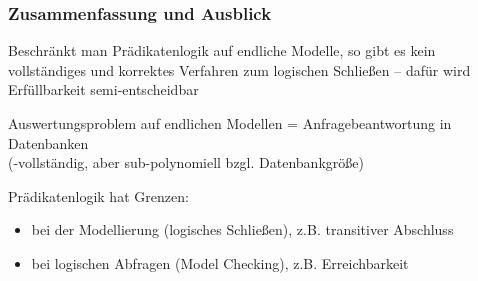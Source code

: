 \documentclass[aspectratio=1610,onlymath]{beamer}
\begin{document}
\begin{frame}\frametitle{Zusammenfassung und Ausblick}

Beschränkt man Prädikatenlogik auf endliche Modelle, so gibt es kein vollständiges und korrektes Verfahren zum logischen Schließen -- dafür wird Erfüllbarkeit semi-entscheidbar\bigskip

Auswertungsproblem auf endlichen Modellen = Anfragebeantwortung in Datenbanken\\
(\PSpace-vollständig, aber sub-polynomiell bzgl. Datenbankgröße)\bigskip

Prädikatenlogik hat Grenzen: 
\begin{itemize}
\item bei der Modellierung (logisches Schließen), z.B. transitiver Abschluss
\item bei logischen Abfragen (Model Checking), z.B. Erreichbarkeit
\end{itemize}\bigskip


\end{frame}

% 
% 
% 
% 
% 
% 


% 
% 
\end{document}
